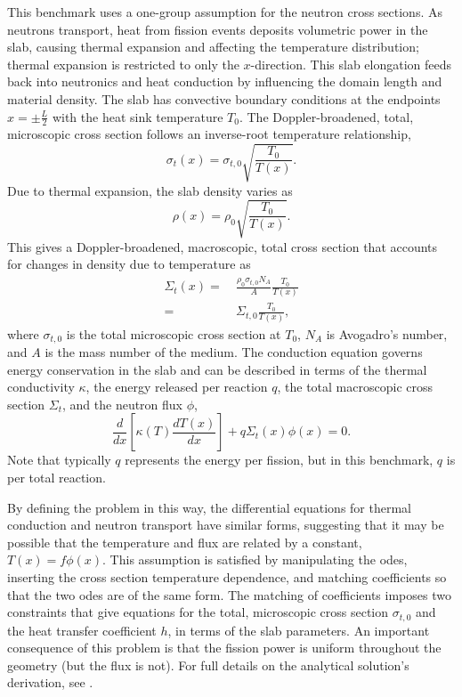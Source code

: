 \documentclass[letterpaper]{mc2023}
\begin{document}
This benchmark uses a one-group assumption for the neutron cross sections. As neutrons transport, heat from fission events deposits
volumetric power in the slab, causing thermal expansion and affecting the temperature distribution; thermal expansion is restricted
to only the $x$-direction. This slab elongation feeds back into neutronics and heat conduction by influencing the domain length and
material density. The slab has convective boundary conditions at the endpoints $x=\pm \frac{L}{2}$ with the heat sink temperature
$T_{0}$. The Doppler-broadened, total, microscopic cross section follows an inverse-root temperature relationship,
\begin{equation}
    \sigma_{t}(x) = \sigma_{t,0}\sqrt{\frac{T_{0}}{T(x)}}.
\end{equation}
Due to thermal expansion, the slab density varies as
\begin{equation} \label{sec:intro:density}
    \rho(x) =  \rho_{0} \sqrt{\frac{T_{0}}{T(x)}}.
\end{equation}
This gives a Doppler-broadened, macroscopic, total cross section that accounts for changes in density due to temperature as
\begin{equation}\begin{aligned} \label{sec:intro:doppler}
    \Sigma_{t}(x) =&\  \frac{\rho_{0}\sigma_{t,0} N_{A}}{A} \frac{T_{0}}{T(x)}\\
    =&\  \Sigma_{t,0}\frac{T_{0}}{T(x)} ,
\end{aligned}\end{equation}
where $ \sigma_{t,0}$ is the total microscopic cross section at $T_{0}$, $N_{A}$ is Avogadro's number, and $A$ is the mass number
of the medium. The conduction equation governs energy conservation in the slab and can be described in terms of the thermal conductivity
$\kappa$, the energy released per reaction $q$, the total macroscopic cross section $\Sigma_{t}$, and the neutron flux $\phi$,
\begin{equation}
     \frac{d}{dx}\left\lbrack\kappa(T)\frac{dT(x)}{dx}\right\rbrack + q \Sigma_{t}(x)\phi(x) = 0.
\end{equation}
Note that typically $q$ represents the energy per fission, but in this benchmark, $q$ is per total reaction.

By defining the problem in this way, the differential equations for thermal conduction and neutron transport have similar forms,
suggesting that it may be possible that the temperature and flux are related by a constant, $T(x)=f\phi(x)$. This
assumption is satisfied by manipulating the \glspl{ode}, inserting the cross section temperature dependence, and matching
coefficients so that the two \glspl{ode} are of the same form. The matching of coefficients imposes two constraints that give
equations for the total, microscopic cross section $\sigma_{t,0}$ and the heat transfer coefficient $h$, in terms of the slab
parameters. An important consequence of this problem is that the fission power is uniform throughout the geometry (but the
flux is not). For full details on the analytical solution's derivation, see \cite{analytical-benchmark}.
\end{document}
